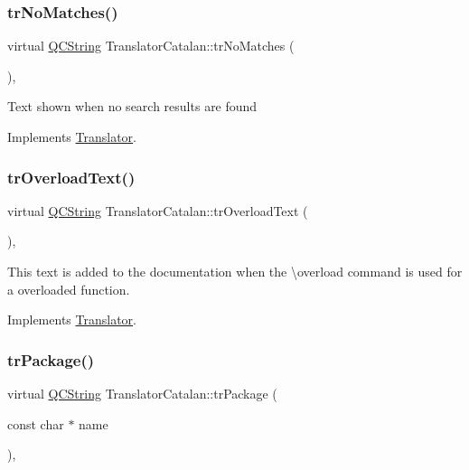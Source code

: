 \subsubsection{\texorpdfstring{trNoMatches()}{trNoMatches()}}
{\footnotesize\ttfamily virtual \mbox{\hyperlink{class_q_c_string}{Q\+C\+String}} Translator\+Catalan\+::tr\+No\+Matches (\begin{DoxyParamCaption}{ }\end{DoxyParamCaption})\hspace{0.3cm}{\ttfamily [inline]}, {\ttfamily [virtual]}}

Text shown when no search results are found 

Implements \mbox{\hyperlink{class_translator}{Translator}}.

\mbox{\label{class_translator_catalan_a90af3462da16b2296c496b800f27ff26}} 
\subsubsection{\texorpdfstring{trOverloadText()}{trOverloadText()}}
{\footnotesize\ttfamily virtual \mbox{\hyperlink{class_q_c_string}{Q\+C\+String}} Translator\+Catalan\+::tr\+Overload\+Text (\begin{DoxyParamCaption}{ }\end{DoxyParamCaption})\hspace{0.3cm}{\ttfamily [inline]}, {\ttfamily [virtual]}}

This text is added to the documentation when the \textbackslash{}overload command is used for a overloaded function. 

Implements \mbox{\hyperlink{class_translator}{Translator}}.

\mbox{\label{class_translator_catalan_aa369f24e2f2d059b59d896c08145d2bb}} 
\subsubsection{\texorpdfstring{trPackage()}{trPackage()}}
{\footnotesize\ttfamily virtual \mbox{\hyperlink{class_q_c_string}{Q\+C\+String}} Translator\+Catalan\+::tr\+Package (\begin{DoxyParamCaption}\item[{const char $\ast$}]{name }\end{DoxyParamCaption})\hspace{0.3cm}{\ttfamily [inline]}, {\ttfamily [virtual]}}

